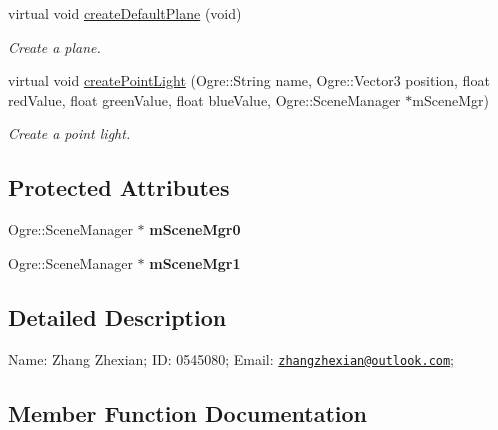 \begin{DoxyCompactItemize}
virtual void \hyperlink{class_basic_tutorial2_a0b18809c3b7c41ef78f617b3329a6e89}{create\+Default\+Plane} (void)
\begin{DoxyCompactList}\small\item\em Create a plane. \end{DoxyCompactList}\item 
virtual void \hyperlink{class_basic_tutorial2_a04d9c8f1339a0f3e4001a34a48ceef87}{create\+Point\+Light} (Ogre\+::\+String name, Ogre\+::\+Vector3 position, float red\+Value, float green\+Value, float blue\+Value, Ogre\+::\+Scene\+Manager $\ast$m\+Scene\+Mgr)
\begin{DoxyCompactList}\small\item\em Create a point light. \end{DoxyCompactList}\end{DoxyCompactItemize}
\subsection*{Protected Attributes}
\begin{DoxyCompactItemize}
\item 
\hypertarget{class_basic_tutorial2_ae654ab27f10abe32bded5af599ca05ed}{}\label{class_basic_tutorial2_ae654ab27f10abe32bded5af599ca05ed} 
Ogre\+::\+Scene\+Manager $\ast$ {\bfseries m\+Scene\+Mgr0}
\item 
\hypertarget{class_basic_tutorial2_afbf2de4f405faea4abc3914cfad2c081}{}\label{class_basic_tutorial2_afbf2de4f405faea4abc3914cfad2c081} 
Ogre\+::\+Scene\+Manager $\ast$ {\bfseries m\+Scene\+Mgr1}
\end{DoxyCompactItemize}


\subsection{Detailed Description}
Name\+: Zhang Zhexian; ID\+: 0545080; Email\+: \href{mailto:zhangzhexian@outlook.com}{\tt zhangzhexian@outlook.\+com}; 

\subsection{Member Function Documentation}
\hypertarget{class_basic_tutorial2_a3074f67362154fce4c99af74c1d7c949}{}\label{class_basic_tutorial2_a3074f67362154fce4c99af74c1d7c949} 
